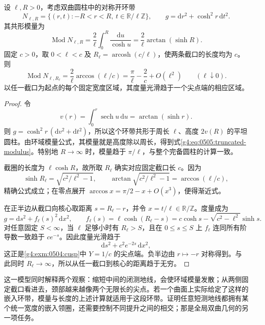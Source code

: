 \begin{proposition}
	\label{g4:prop:0505:truncated-cylinder}
	设 \(\ell,R>0\)，考虑双曲圆柱中的对称开环带
	\[
		N_{\ell,R}=\{(r,t):-R<r<R,\ t\in\mathbb R/\ell\mathbb Z\},
		\qquad g=\mathrm{d}r^2+\cosh^2r\,\mathrm{d}t^2.
	\]
	其共形模量为
	\begin{equation}
		\label{g4:eq:0505:truncated-modulus}
		\operatorname{Mod}N_{\ell,R}
		=\frac2\ell\int_0^R\frac{\mathrm{d}u}{\cosh u}
		=\frac2\ell\arctan(\sinh R).
	\end{equation}
	固定 \(c>0\)，取 \(0<\ell<c\) 及 \(R_\ell=\operatorname{arcosh}(c/\ell)\)，使两条截口的长度均为 \(c\)。则
	\[
		\operatorname{Mod}N_{\ell,R_\ell}
		=\frac2\ell\arccos(\ell/c)
		=\frac\pi\ell-\frac2c+O(\ell^2)
		\qquad(\ell\downarrow0).
	\]
	以任一截口为起点的每个固定宽度区域，其度量光滑趋于一个尖点端的相应区域。
\end{proposition}
\begin{proof}
	令
	\[
		v(r)=\int_0^r\operatorname{sech}u\,\mathrm{d}u
		=\arctan(\sinh r).
	\]
	则 \(g=\cosh^2r\,(\mathrm{d}v^2+\mathrm{d}t^2)\)，所以这个环带共形于周长 \(\ell\)、高度 \(2v(R)\) 的平坦圆柱。由环域模量公式，其模量就是高度除以周长，得到式\eqref{g4:eq:0505:truncated-modulus}。特别地 \(R\to\infty\) 时，模量趋于 \(\pi/\ell\)，与整个完备圆柱的计算一致。

	截圈的长度为 \(\ell\cosh R\)，故所取 \(R_\ell\) 确实对应固定截口长 \(c\)。因为
	\[
		\sinh R_\ell=\sqrt{c^2/\ell^2-1},
		\qquad \arctan\sqrt{c^2/\ell^2-1}=\arccos(\ell/c),
	\]
	精确公式成立；在零点展开 \(\arccos x=\pi/2-x+O(x^3)\)，便得渐近式。

	在正半边从截口向核心取距离 \(s=R_\ell-r\)，并令 \(x=t/\ell\in\mathbb R/\mathbb Z\)。度量成为
	\[
		g=\mathrm{d}s^2+f_\ell(s)^2\,\mathrm{d}x^2,
		\qquad
		f_\ell(s)=\ell\cosh(R_\ell-s)
		=c\cosh s-\sqrt{c^2-\ell^2}\sinh s.
	\]
	对任意固定 \(S<\infty\)，当 \(\ell\) 足够小时有 \(R_\ell>S\)，且在 \(0\le s\le S\) 上 \(f_\ell\) 连同所有阶导数一致趋于 \(ce^{-s}\)。因此度量光滑趋于
	\[
		\mathrm{d}s^2+c^2e^{-2s}\,\mathrm{d}x^2,
	\]
	这正是\cref{g4:exm:0504:cusp}中 \(Y=1/c\) 的尖点端。负半边由 \(r\mapsto-r\) 对称得到。与此同时 \(R_\ell\to\infty\)，所以从任一截口到核心的距离趋于无穷。
\end{proof}

这一模型同时解释两个观察：缩短中间的闭测地线，会使环域模量发散；从两侧固定截口看进去，颈部越来越像两个无限长的尖点。若一个曲面上实际给定了这样的嵌入环带，模量与长度的上述计算就适用于这段环带。证明任意短测地线都拥有某个统一宽度的嵌入领圈，还需要控制不同提升之间的相交；那是全局双曲几何的另一项任务。
